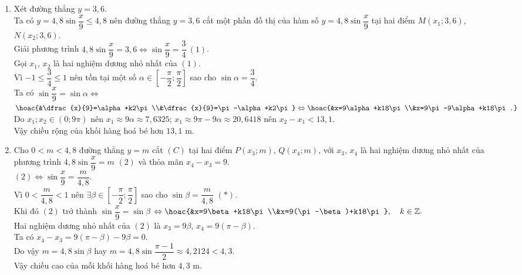 \begin{ex}
{\begin{enumerate}
			\item Xét đường  thẳng $y=3{,}6$.\\
			Ta có $y=4{,}8\sin\dfrac{x}{9} \le 4{,}8$ nên đường thẳng $y=3{,}6$ cắt một phần đồ thị của hàm số $y=4{,}8\sin\dfrac{x}{9}$ tại hai  điểm $M\left(x_1;3{,}6\right)$, $N\left(x_2;3{,}6\right)$.\\
			Giải phương trình $4{,}8\sin\dfrac{x}{9}=3{,}6 \Leftrightarrow \sin\dfrac{x}{9} =\dfrac{3}{4}\  (1)$. \\
			 Gọi $x_1$, $x_2$ là hai nghiệm dương nhỏ nhất của $(1)$.\\
			Vì $-1\le \dfrac{3}{4}\le 1$ nên tồn tại một số $\alpha \in \left[-\dfrac{\pi}{2};\dfrac{\pi}{2}\right]$ sao cho $\sin\alpha=\dfrac{3}{4}$.\\ 
			 Ta có $\sin\dfrac{x}{9}=\sin\alpha \Leftrightarrow $
			 $\hoac{&\dfrac{x}{9}=\alpha+k2\pi\\&\dfrac{x}{9}=\pi-\alpha+k2\pi} \Leftrightarrow \hoac{&x=9\alpha+k18\pi\\&x=9\pi-9\alpha+k18\pi.}$\\
			 Do $x_1; x_2\in (0;9\pi)$ nên $x_1 \approx 9\alpha \approx 7{,}6325$; $x_1 \approx 9\pi-9\alpha \approx 20{,}6418$ nên $x_2-x_1<13{,}1$.\\
			Vậy chiều  rộng của khối hàng hoá bé hơn $13{,}1$ m.
			\item Cho $0<m<4{,}8$ đường thẳng $y=m$ cắt $(C)$ tại hai điểm $P\left(x_3;m\right)$, $Q\left(x_4;m\right)$, với $x_3$, $x_4$ là hai nghiệm dương nhỏ nhất của phương trình $4{,}8\sin\dfrac{x}{9}=m$ $(2)$ và thỏa mãn  $x_4-x_3=9$.\\
			$(2) \Leftrightarrow \sin\dfrac{x}{9}=\dfrac{m}{4{,}8}$. \\ 
			Vì  $0<\dfrac{m}{4{,}8}<1$ nên $\exists \beta \in \left[-\dfrac{\pi}{2};\dfrac{\pi}{2} \right]$ sao cho $\sin\beta=\dfrac{m}{4{,}8}$ $(*)$.\\
			 Khi đó $(2)$ trở thành $\sin\dfrac{x}{9}=\sin\beta$
			$ \Leftrightarrow  \hoac{&x=9\beta+k18\pi\\&x=9(\pi-\beta)+k18\pi}, \quad k\in \mathbb{Z}.$\\
			Hai nghiệm dương  nhỏ nhất của $(2)$ là $x_3=9\beta$, $x_4=9(\pi-\beta)$.\\
			Ta có  $x_4-x_3=9(\pi-\beta)-9\beta=0$.\\
			 Do vậy $m=4{,}8\sin\beta$ hay $m=4{,}8\sin\dfrac{\pi-1}{2} \approx 4{,}2124<4{,}3$.\\
			Vậy chiều cao của mỗi khối  hàng hoá bé hơn $4{,}3$ m.
		\end{enumerate}
	} 
\end{ex}

